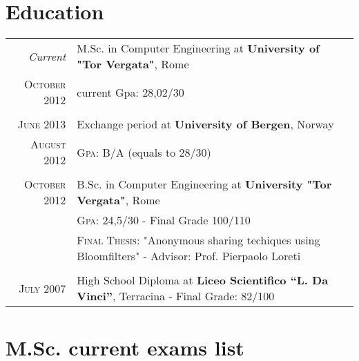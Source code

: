 \documentclass[a4paper,10pt]{article} %
\begin{document}
\section{Education}

\begin{tabular}{r|p{11cm}}	
\emph{Current} & M.Sc. in Computer Engineering at \textbf{University of "Tor Vergata"}, Rome
\\ \textsc{October} 2012 & current Gpa: 28,02/30 \\
\multicolumn{2}{c}{} \\


\textsc{June} 2013 & Exchange period at \textbf{University of Bergen}, Norway
\\ \textsc{August} 2012 &\textsc{Gpa}: B/A (equals to 28/30)
\\ 
\multicolumn{2}{c}{} \\


\textsc{October} 2012 & B.Sc. in Computer Engineering at \textbf{University "Tor Vergata"}, Rome\\
& \textsc{Gpa}: 24,5/30 - Final Grade 100/110\\
& \textsc{Final Thesis}: "Anonymous sharing techiques using Bloomfilters" - Advisor: Prof. Pierpaolo Loreti\\
\multicolumn{2}{c}{} \\


\textsc{July} 2007& High School Diploma at \textbf{Liceo Scientifico ``L. Da Vinci''}, Terracina - Final Grade: 82/100
\end{tabular}




\section{M.Sc. current exams list}
\end{document}
